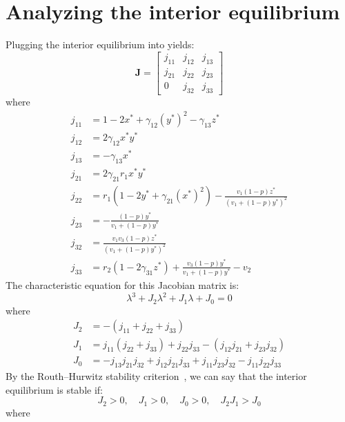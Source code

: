 \section{Analyzing the interior equilibrium}\label{sec:stability_interior_equilibrium}
Plugging the interior equilibrium into  yields:
\begin{equation}
    \textbf{J}=\begin{bmatrix}
        j_{11} & j_{12} & j_{13}\\
        j_{21} & j_{22} & j_{23}\\
        0 & j_{32} & j_{33}
    \end{bmatrix}
    \label{eq:5.16}
\end{equation}
where
\begin{align*}
    j_{11} &= 1-2x^*+\gamma_{12}\left(y^*\right)^2-\gamma_{13}z^*\\
    j_{12} &= 2\gamma_{12}x^*y^*\\
    j_{13} &= -\gamma_{13}x^*\\
    j_{21} &= 2\gamma_{21}r_1x^*y^*\\
    j_{22} &= r_1\left(1-2y^*+\gamma_{21}\left(x^*\right)^2\right)-\frac{v_1\left(1-p\right)z^*}{\left(v_1+\left(1-p\right)y^*\right)^2}\\
    j_{23} &= -\frac{\left(1-p\right)y^*}{v_1+\left(1-p\right)y^*}\\
    j_{32} &= \frac{v_1v_3\left(1-p\right)z^*}{\left(v_1+\left(1-p\right)y^*\right)^2}\\
    j_{33} &= r_2\left(1-2\gamma_{31}z^*\right)+\frac{v_3\left(1-p\right)y^*}{v_1+\left(1-p\right)y^*}-v_2
\end{align*}
The characteristic equation for this Jacobian matrix is:
\begin{equation}
    \lambda^3+J_2\lambda^2+J_1\lambda+J_0=0
    \label{eq:5.17}
\end{equation}
where
\begin{align*}
    J_2 &= -\left(j_{11}+j_{22}+j_{33}\right)\\
    J_1 &= j_{11}\left(j_{22}+j_{33}\right)+j_{22}j_{33}-\left(j_{12}j_{21}+j_{23}j_{32}\right)\\
    J_0 &= -j_{13}j_{21}j_{32}+j_{12}j_{21}j_{33}+j_{11}j_{23}j_{32}-j_{11}j_{22}j_{33}
\end{align*}
By the Routh–Hurwitz stability criterion~\cite{routh1877treatise}, we can say that the interior equilibrium is stable if:
\[
J_2>0,\quad J_1>0,\quad J_0>0,\quad J_2J_1>J_0
\]
where
